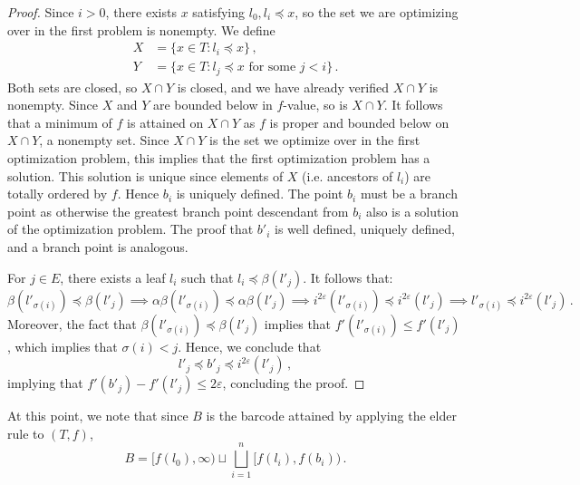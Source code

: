 \documentclass{article}
\theoremstyle{definition}
\renewcommand{\epsilon}{\varepsilon}
\begin{document}
\begin{proof}
    Since $i > 0$, there exists $x$ satisfying $l_0,l_i \preceq x$, so the set we are optimizing over in the first problem is nonempty. We define
    \begin{align*}
        X &= \{x \in T: l_i \preceq x\}\,,\\
        Y &= \{x \in T: l_j \preceq x \text{ for some }j<i\}\,.
    \end{align*}
    Both sets are closed, so $X \cap Y$ is closed, and we have already verified $X\cap Y$ is nonempty. Since $X$ and $Y$ are bounded below in $f$-value, so is $X\cap Y$. It follows that a minimum of $f$ is attained on $X \cap Y$ as $f$ is proper and bounded below on $X \cap Y$, a nonempty set. Since $X \cap Y$ is the set we optimize over in the first optimization problem, this implies that the first optimization problem has a solution. This solution is unique since elements of $X$ (i.e. ancestors of $l_i$) are totally ordered by $f$. Hence $b_i$ is uniquely defined. The point $b_i$ must be a branch point as otherwise the greatest branch point descendant from $b_i$ also is a solution of the optimization problem. The proof that $b'_i$ is well defined, uniquely defined, and a branch point is analogous.

    For $j \in E$, there exists a leaf $l_i$ such that $l_i \preceq \beta(l'_j)$. It follows that:
    \begin{equation*}
        \beta(l'_{\sigma(i)}) \preceq \beta(l'_j) \implies \alpha\beta(l'_{\sigma(i)}) \preceq \alpha\beta(l'_j) \implies i^{2\epsilon}(l'_{\sigma(i)}) \preceq i^{2\epsilon}(l'_j) \implies l'_{\sigma(i)} \preceq i^{2\epsilon}(l'_j)\,.
    \end{equation*}
    Moreover, the fact that $\beta(l'_{\sigma(i)}) \preceq \beta(l'_j)$ implies that $f'(l'_{\sigma(i)}) \leq f'(l'_j)$, which implies that $\sigma(i) < j$. Hence, we conclude that
    \begin{equation*}
        l'_j \preceq b'_j \preceq i^{2\epsilon}(l'_j)\,,
    \end{equation*}
    implying that $f'(b'_j) - f'(l'_j) \leq 2\epsilon$, concluding the proof.
\end{proof}

At this point, we note that since $B$ is the barcode attained by applying the elder rule to $(T,f)$,
\begin{equation*}
    B = \big[f(l_0), \infty\big) \sqcup \bigsqcup_{i = 1}^n \big[f(l_i), f(b_i)\big)\,.
\end{equation*}
\end{document}
